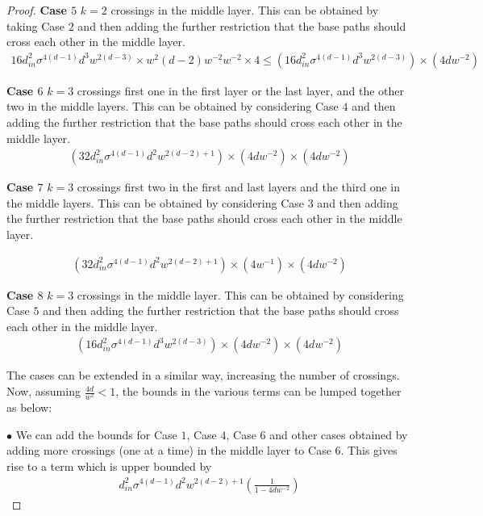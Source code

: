 \begin{proof}
\textbf{Case $5$} $k=2$ crossings in the middle layer. This can be obtained by taking Case $2$ and then adding the further restriction that the base paths should cross each other in the middle layer. 
\begin{align*}
16d^2_{in}\sigma^{4(d-1)} d^3 w^{2(d-3)}\times w^2(d-2) w^{-2}w^{-2}\times 4\leq (16d^2_{in}\sigma^{4(d-1)} d^3 w^{2(d-3)}) \times (4dw^{-2})
\end{align*}


\textbf{Case $6$} $k=3$ crossings first one in the first layer or the last layer, and the other two in the middle layers. This can be obtained by considering Case $4$ and then adding the further restriction that the base paths should cross each other in the middle layer. 
\begin{align*}
(32d^2_{in}\sigma^{4(d-1)}d^2 w^{2(d-2)+1} )\times (4dw^{-2}) \times (4dw^{-2}) 
\end{align*}

\textbf{Case $7$} $k=3$ crossings first two in the first and last layers and the third one in the middle layers. This can be obtained by considering Case $3$ and then adding the further restriction that the base paths should cross each other in the middle layer. 

\begin{align*}
(32d^2_{in}\sigma^{4(d-1)}d^2 w^{2(d-2)+1})\times (4w^{-1})\times (4dw^{-2}) 
\end{align*}

\textbf{Case $8$} $k=3$ crossings in the middle layer. This can be obtained by considering Case $5$ and then adding the further restriction that the base paths should cross each other in the middle layer. 
\begin{align*}
 (16d^2_{in}\sigma^{4(d-1)} d^3 w^{2(d-3)}) \times (4dw^{-2})\times (4dw^{-2}) 
\end{align*}


The cases can be extended in a similar way, increasing the number of crossings.  Now, assuming $\frac{4d}{w^2}<1$, the bounds in the various terms can be lumped together as below:

$\bullet$ We can add the bounds for Case $1$, Case $4$, Case $6$ and other cases obtained by adding more crossings (one at a time) in the middle layer to Case $6$. This gives rise to a term which is upper bounded by 
\begin{align*}
d^2_{in}\sigma^{4(d-1)}d^2w^{2(d-2)+1}\left(\frac{1}{1-4dw^{-2}}\right)
\end{align*}


\end{proof}

